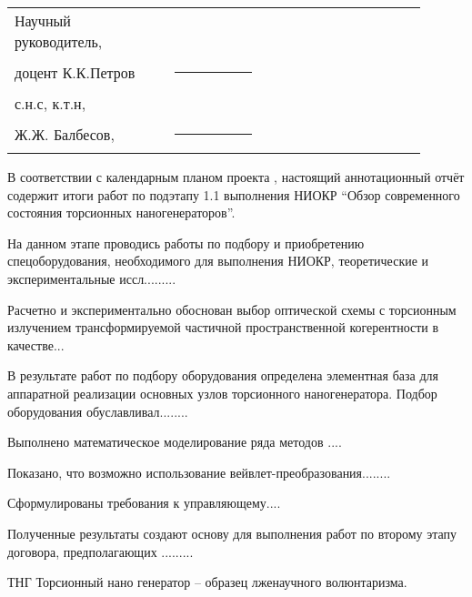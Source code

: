 \documentclass[usehyperref,12pt]{G7-32}
\newcommand{\No}{\textnumero{}}
\begin{document}
\frontmatter %



\Executors %
\begin{longtable}{p{0.35\linewidth}p{0.2\linewidth}p{0.35\linewidth}}
Научный руководитель, 	&		&	\\
доцент К.К.Петров	&\rule{1\linewidth}{0.1pt}	&  \\ \vspace{1cm}

с.н.с, к.т.н,  &		&	\\
Ж.Ж. Балбесов, & \rule{1\linewidth}{0.1pt}& \\
\end{longtable}

\Referat %
В соответствии с календарным планом проекта \No, настоящий аннотационный отчёт содержит итоги работ по подэтапу 1.1 выполнения НИОКР ``Обзор современного состояния торсионных наногенераторов''.

На данном этапе проводись работы по подбору и приобретению спецоборудования, необходимого для выполнения НИОКР, теоретические и экспериментальные иссл.........

Расчетно и экспериментально обоснован выбор оптической схемы с торсионным излучением трансформируемой частичной пространственной когерентности в качестве...

В результате работ по подбору оборудования определена элементная база для аппаратной реализации основных узлов торсионного наногенератора. Подбор оборудования обуславливал........

Выполнено математическое моделирование ряда методов .... 

Показано, что возможно использование вейвлет-преобразования........

Сформулированы требования к управляющему....

Полученные результаты создают основу для выполнения работ по второму этапу договора, предполагающих .........

\tableofcontents

\NormRefs %
\Defines %


\Abbreviations %
\begin{abbreviation}
\item[ТНГ] Торсионный нано генератор -- образец лженаучного волюнтаризма.
\end{abbreviation}
\end{document}
